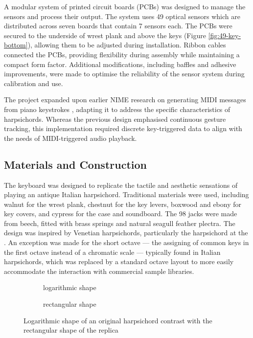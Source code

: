 A modular system of printed circuit boards (PCBs) was designed to manage the sensors and process their output. The system uses 49 optical sensors which are distributed across seven boards that contain 7 sensors each. The PCBs were secured to the underside of wrest plank and above the keys (Figure \ref{fig:49-key-bottom}), allowing them to be adjusted during installation. Ribbon cables connected the PCBs, providing flexibility during assembly while maintaining a compact form factor. Additional modifications, including baffles and adhesive improvements, were made to optimise the reliability of the sensor system during calibration and use.

The project expanded upon earlier NIME research on generating MIDI messages from piano keystrokes \cite{McPherson2013}, adapting it to address the specific characteristics of harpsichords. Whereas the previous design emphasised continuous gesture tracking, this implementation required discrete key-triggered data to align with the needs of MIDI-triggered audio playback. 

\subsection{Materials and Construction}
The keyboard was designed to replicate the tactile and aesthetic sensations of playing an antique Italian harpsichord. Traditional materials were used, including walnut for the wrest plank, chestnut for the key levers, boxwood and ebony for key covers, and cypress for the case and soundboard. The 98 jacks were made from beech, fitted with brass springs and natural seagull feather plectra. The design was inspired by Venetian harpsichords, particularly the  harpsichord at the . An exception was made for the short octave --- the assigning of common keys in the first octave instead of a chromatic scale --- typically found in Italian harpsichords, which was replaced by a standard octave layout to more easily accommodate the interaction with commercial sample libraries. 

\begin{figure}[!b]
    \centering
     \begin{subfigure}[h]{0.4\linewidth}
        \centering
                    
        \caption{logarithmic shape}    
        \label{fig:log-harp}
    \end{subfigure}

    
    \begin{subfigure}[h]{0.4\linewidth}
        \centering
                
        \caption{rectangular shape}
        \label{fig:rect-harp}
    \end{subfigure}
    \caption{Logarithmic shape of an original  harpsichord contrast with the rectangular shape of the replica}    
    \Description{}
    \label{fig:log-harp-comp}
\end{figure}

